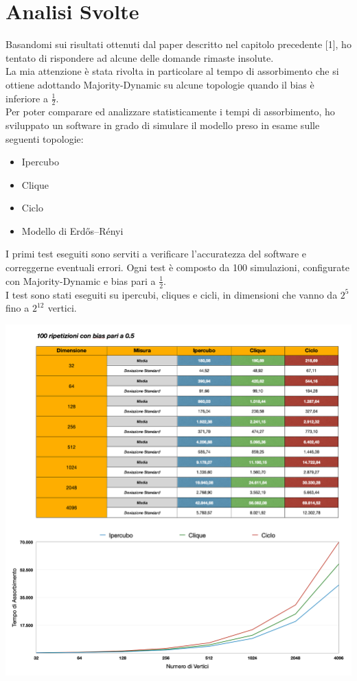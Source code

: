 \documentclass{article}
\begin{document}
\section{Analisi Svolte}
Basandomi sui risultati ottenuti dal paper descritto nel capitolo precedente [1], ho tentato di rispondere ad alcune delle domande rimaste insolute.\\
La mia attenzione è stata rivolta in particolare al tempo di assorbimento che si ottiene adottando Majority-Dynamic su alcune topologie quando il bias è inferiore a $\frac{1}{2}$.\\
Per poter comparare ed analizzare statisticamente i tempi di assorbimento, ho sviluppato un software in grado di simulare il modello preso in esame sulle seguenti topologie:
 \begin{itemize}
\item Ipercubo
\item Clique
\item Ciclo
\item Modello di Erdős–Rényi
\end{itemize}
I primi test eseguiti sono serviti a verificare l'accuratezza del software e correggerne eventuali errori. Ogni test è composto da 100 simulazioni, configurate con Majority-Dynamic e bias pari a $\frac{1}{2}$.\\
I test sono stati eseguiti su ipercubi, cliques e cicli, in dimensioni che vanno da $2^{5^{\mathrm{}}}$ fino a $2^{12^{\mathrm{}}}$ vertici.\\
\begin{center}
\includegraphics[width=1\textwidth]{test_bias05.png}
\end{center}
\end{document}
